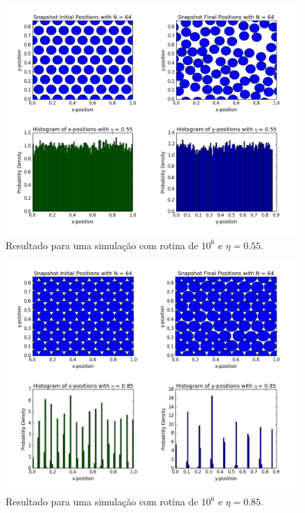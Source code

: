 \documentclass[%
reprint,
amsmath,amssymb,
aps,
12pt
]{revtex4-1}
\begin{document}
\begin{figure}[!h]
	\centering
	\includegraphics[scale=0.3]{md055.png}
	\caption{Resultado para uma simulação com rotina de $ 10^6 $ e $ \eta = 0.55 $.
		\label{md055}}
\end{figure}
\begin{figure}[!h]
	\centering
	\includegraphics[scale=0.3]{md085.png}
	\caption{Resultado para uma simulação com rotina de $ 10^6 $ e $ \eta = 0.85 $.
		\label{md085}}
\end{figure}
\end{document}
